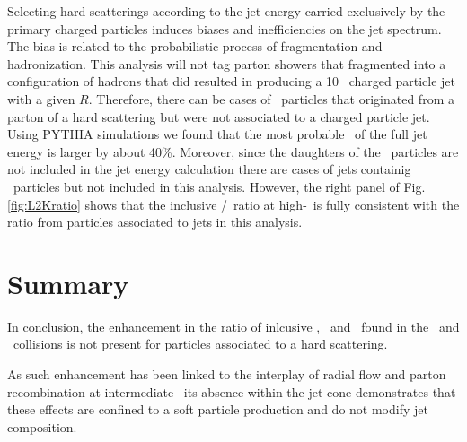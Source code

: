 Selecting hard scatterings according to the jet energy carried exclusively by the primary charged particles induces biases and inefficiencies on the jet spectrum.
The bias is related to the probabilistic process of fragmentation and hadronization.
This analysis will not tag parton showers that fragmented into a configuration of hadrons that did resulted in producing a 10 \gev\ charged particle jet with a given $R$.
Therefore, there can be cases of \Vzero\ particles that originated from a parton of a hard scattering but were not associated to a charged particle jet. 
Using PYTHIA simulations we found that the most probable \pt\ of the full jet energy is larger by about 40\%. 
Moreover, since the daughters of the \Vzero\ particles are not included in the jet energy calculation there are cases of jets containig \Vzero\ particles but not included in this analysis. 
However, the right panel of Fig. \ref{fig:L2Kratio} shows that the inclusive \lda/\ks\ ratio at high-\pt\ is fully consistent with the ratio from particles associated to jets in this analysis.


\section{Summary}

In conclusion, the enhancement in the ratio of inlcusive \lda, \alda\ and \ks\ found in the \pPb\ and \PbPb\ collisions is not present for particles associated to a hard scattering. 


As such enhancement has been linked to the interplay of radial flow and parton recombination at intermediate-\pt\ its absence within the jet cone demonstrates that these effects are confined to a soft particle production and do not modify jet composition. 


